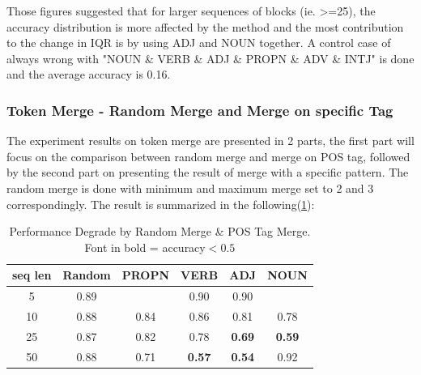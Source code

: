 \documentclass[12pt]{article}
\begin{document}
Those figures suggested that for larger sequences of blocks (ie. >=25), the accuracy distribution is more affected by the method and the most contribution to the change in IQR is by using ADJ and NOUN together.
A control case of always wrong with "NOUN \& VERB \& ADJ \& PROPN \& ADV \& INTJ" is done and the average accuracy is 0.16. 

\subsubsection{Token Merge - Random Merge and Merge on specific Tag }
The experiment results on token merge are presented in 2 parts, the first part will focus on the comparison between random merge and merge on POS tag, followed by the second part on presenting the result of merge with a specific pattern. The random merge is done with minimum and maximum merge set to 2 and 3 correspondingly. The result is summarized in the following(\ref{tab:mergeDegrade}):


\begin{table}[!h]
\fontsize{10pt}{10pt}\selectfont
\begin{tabular}{|c|c|c|c|c|c|}
\hline
seq len & Random & PROPN & VERB                                                         & ADJ                                                          & NOUN                                                         \\ \hline
5       & 0.89   &       & 0.90                                                         & 0.90                                                         &                                                              \\ \hline
10      & 0.88   & 0.84  & 0.86                                                         & 0.81                                                         & 0.78                                                         \\ \hline
25      & 0.87   & 0.82  & 0.78                                                         &\textbf{0.69} & \textbf{0.59} \\ \hline
50      & 0.88   & 0.71  & \textbf{0.57} &  \textbf{0.54} & 0.92                                                         \\ \hline
\end{tabular}
\caption{Performance Degrade by Random Merge \& POS Tag Merge.\\ Font in bold = accuracy$<0.5$}
\label{tab:mergeDegrade}
\end{table}
\end{document}
